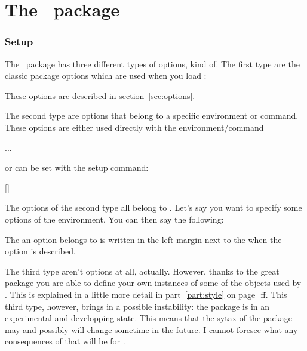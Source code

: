 \documentclass[load-preamble+,scrartcl={DIV10}]{cnltx-doc}
\begin{document}
\part{The \ExSheets\ package}\label{part:exsheets}
\section{Setup}
The \ExSheets\ package has three different types of options, kind of.  The
first type are the classic package options which are used when you load
\ExSheets:
\begin{sourcecode}
  \usepackage[<options>]{exsheets}
\end{sourcecode}
These options are described in section~\ref{sec:options}.

The second type are options that belong to a specific environment or command.
These options are either used directly with the environment/command
\begin{sourcecode}
  \begin{env}[<options>]
   ...
  \end{env}
\end{sourcecode}
or can be set with the setup command:
\begin{commands}
  []
\end{commands}
The options of the second type all belong to .  Let's say you
want to specify some options of the  environment.  You can then
say the following:
\begin{sourcecode}
\end{sourcecode}
The  an option belongs to is written in the left margin next
to the when the option is described.

The third type aren't options at all, actually.  However, thanks to the great
 package you are able to define your own instances of some of
the objects used by \ExSheets.  This is explained in a little more detail in
part~\ref{part:style} on page~\pageref{part:style}\,ff.  This third type,
however, brings in a possible instability: the  package is in
an experimental and developping state.  This means that the sytax of the
package may and possibly will change sometime in the future.  I cannot foresee
what any consequences of that will be for \ExSheets.
\end{document}
